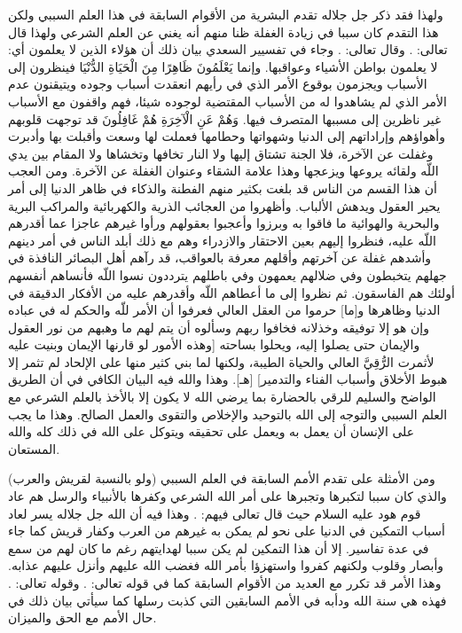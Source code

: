 ولهذا فقد ذكر جل جلاله تقدم البشرية من الأقوام السابقة في هذا العلم السببي ولكن هذا التقدم كان سببا في زيادة الغفلة ظنا منهم أنه يغني عن العلم الشرعي ولهذا قال تعالى: 
\quranayah*[40][83]{\footnotesize \surahname*[40]}. وقال تعالى:
\quranayah*[30][7]{\footnotesize \surahname*[30]}. وجاء في تفسيير السعدي بيان ذلك أن هؤلاء الذين لا يعلمون أي: لا يعلمون بواطن الأشياء وعواقبها. وإنما { يَعْلَمُونَ ظَاهِرًا مِنَ الْحَيَاةِ الدُّنْيَا } فينظرون إلى الأسباب ويجزمون بوقوع الأمر الذي في رأيهم انعقدت أسباب وجوده ويتيقنون عدم الأمر الذي لم يشاهدوا له من الأسباب المقتضية لوجوده شيئا، فهم واقفون مع الأسباب غير ناظرين إلى مسببها المتصرف فيها. { وَهُمْ عَنِ الْآخِرَةِ هُمْ غَافِلُونَ } قد توجهت قلوبهم وأهواؤهم وإراداتهم إلى الدنيا وشهواتها وحطامها فعملت لها وسعت وأقبلت بها وأدبرت وغفلت عن الآخرة، فلا الجنة تشتاق إليها ولا النار تخافها وتخشاها ولا المقام بين يدي اللّه ولقائه يروعها ويزعجها وهذا علامة الشقاء وعنوان الغفلة عن الآخرة. ومن العجب أن هذا القسم من الناس قد بلغت بكثير منهم الفطنة والذكاء في ظاهر الدنيا إلى أمر يحير العقول ويدهش الألباب. وأظهروا من العجائب الذرية والكهربائية والمراكب البرية والبحرية والهوائية ما فاقوا به وبرزوا وأعجبوا بعقولهم ورأوا غيرهم عاجزا عما أقدرهم اللّه عليه، فنظروا إليهم بعين الاحتقار والازدراء وهم مع ذلك أبلد الناس في أمر دينهم وأشدهم غفلة عن آخرتهم وأقلهم معرفة بالعواقب، قد رآهم أهل البصائر النافذة في جهلهم يتخبطون وفي ضلالهم يعمهون وفي باطلهم يترددون نسوا اللّه فأنساهم أنفسهم أولئك هم الفاسقون. ثم نظروا إلى ما أعطاهم اللّه وأقدرهم عليه من الأفكار الدقيقة في الدنيا وظاهرها و[ما] حرموا من العقل العالي فعرفوا أن الأمر للّه والحكم له في عباده وإن هو إلا توفيقه وخذلانه فخافوا ربهم وسألوه أن يتم لهم ما وهبهم من نور العقول والإيمان حتى يصلوا إليه، ويحلوا بساحته [وهذه الأمور لو قارنها الإيمان وبنيت عليه لأثمرت الرُّقِيَّ العالي والحياة الطيبة، ولكنها لما بني كثير منها على الإلحاد لم تثمر إلا هبوط الأخلاق وأسباب الفناء والتدمير] [هـ]. وهذا والله فيه البيان الكافي في أن الطريق الواضح والسليم للرقي بالحضارة بما يرضي الله لا يكون إلا بالأخذ بالعلم الشرعي مع العلم السببي والتوجه إلى الله بالتوحيد والإخلاص والتقوى والعمل الصالح. وهذا ما يجب على الإنسان أن يعمل به ويعمل على تحقيقه ويتوكل على الله في ذلك كله والله المستعان.

ومن الأمثلة على تقدم الأمم السابقة في العلم السببي (ولو بالنسبة لقريش والعرب) والذي كان سببا لتكبرها وتجبرها على أمر الله الشرعي وكفرها بالأنبياء والرسل هم عاد قوم هود عليه السلام حيث قال تعالى فيهم:
\quranayah*[46][26]{\footnotesize \surahname*[46]}. وهذا فيه أن الله جل جلاله يسر لعاد أسباب التمكين في الدنيا على نحو لم يمكن به غيرهم من العرب وكفار قريش كما جاء في عدة تفاسير. إلا أن هذا التمكين لم يكن سببا لهدايتهم رغم ما كان لهم من سمع وأبصار وقلوب ولكنهم كفروا واستهزؤا بأمر الله فغضب الله عليهم وأنزل عليهم عذابه. وهذا الأمر قد تكرر مع العديد من الأقوام السابقة كما في قوله تعالى: \quranayah*[6][6]{\footnotesize \surahname*[6]}. وقوله تعالى: \quranayah*[30][9]{\footnotesize \surahname*[30]}. فهذه هي سنة الله ودأبه في الأمم السابقين التي كذبت رسلها كما سيأتي بيان ذلك في حال الأمم مع الحق والميزان.

